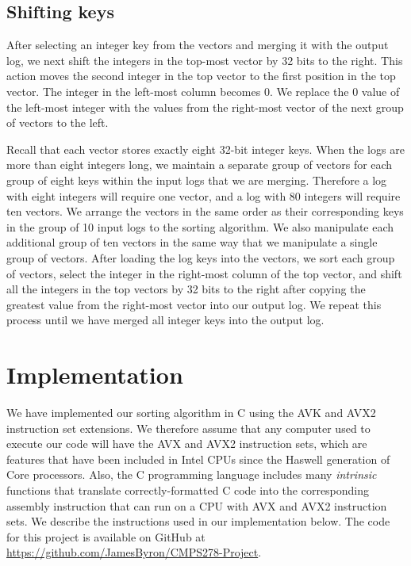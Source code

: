 \documentclass[10pt,twocolumn]{article}
\begin{document}
\subsection{Shifting keys}
After selecting an integer key from the vectors and merging it with the output log, we next shift the integers in the top-most vector by 32 bits to the right.  This action moves the second integer in the top vector to the first position in the top vector.  The integer in the left-most column becomes 0.  We replace the 0 value of the left-most integer with the values from the right-most vector of the next group of vectors to the left.

Recall that each vector stores exactly eight 32-bit integer keys.  When the logs are more than eight integers long, we maintain a separate group of vectors for each group of eight keys within the input logs that we are merging.  Therefore a log with eight integers will require one vector, and a log with 80 integers will require ten vectors.  We arrange the vectors in the same order as their corresponding keys in the group of 10 input logs to the sorting algorithm.  We also manipulate each additional group of ten vectors in the same way that we manipulate a single group of vectors.  After loading the log keys into the vectors, we sort each group of vectors, select the integer in the right-most column of the top vector, and shift all the integers in the top vectors by 32 bits to the right after copying the greatest value from the right-most vector into our output log.  We repeat this process until we have merged all integer keys into the output log.



\section{Implementation}
We have implemented our sorting algorithm in C using the AVK and AVX2 instruction set extensions.  We therefore assume that any computer used to execute our code will have the AVX and AVX2 instruction sets, which are features that have been included in Intel CPUs since the Haswell generation of Core processors.  Also, the C programming language includes many \textit{intrinsic} functions that translate correctly-formatted C code into the corresponding assembly instruction that can run on a CPU with AVX and AVX2 instruction sets.  We describe the instructions used in our implementation below.  The code for this project is available on GitHub at \url{https://github.com/JamesByron/CMPS278-Project}.
\end{document}
